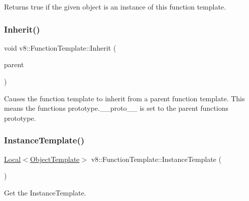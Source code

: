 Returns true if the given object is an instance of this function template. \mbox{\label{classv8_1_1FunctionTemplate_abc11c462facf11bafd541892815c5425}} 
\subsubsection{\texorpdfstring{Inherit()}{Inherit()}}
{\footnotesize\ttfamily void v8\+::\+Function\+Template\+::\+Inherit (\begin{DoxyParamCaption}\item[{\mbox{\hyperlink{classv8_1_1Local}{Local}}$<$ \mbox{\hyperlink{classv8_1_1FunctionTemplate}{Function\+Template}} $>$}]{parent }\end{DoxyParamCaption})}

Causes the function template to inherit from a parent function template. This means the function\textquotesingle{}s prototype.\+\_\+\+\_\+proto\+\_\+\+\_\+ is set to the parent function\textquotesingle{}s prototype. \mbox{\label{classv8_1_1FunctionTemplate_a00dd9725566908e8fd14064542f5a781}} 
\subsubsection{\texorpdfstring{Instance\+Template()}{InstanceTemplate()}}
{\footnotesize\ttfamily \mbox{\hyperlink{classv8_1_1Local}{Local}}$<$\mbox{\hyperlink{classv8_1_1ObjectTemplate}{Object\+Template}}$>$ v8\+::\+Function\+Template\+::\+Instance\+Template (\begin{DoxyParamCaption}{ }\end{DoxyParamCaption})}

Get the Instance\+Template. \mbox{\label{classv8_1_1FunctionTemplate_a3b675b8327f08a7c6a4c4d9dce5cb3b3}} 
